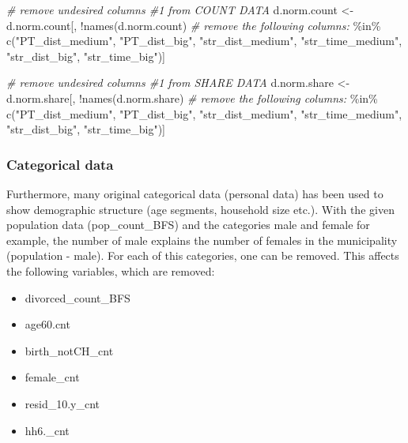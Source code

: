 \documentclass[
]{article}
\newenvironment{Shaded}{\begin{snugshade}}{\end{snugshade}}
\newcommand{\CommentTok}[1]{\textcolor[rgb]{0.56,0.35,0.01}{\textit{#1}}}
\newcommand{\FunctionTok}[1]{\textcolor[rgb]{0.00,0.00,0.00}{#1}}
\newcommand{\NormalTok}[1]{#1}
\newcommand{\OtherTok}[1]{\textcolor[rgb]{0.56,0.35,0.01}{#1}}
\newcommand{\SpecialCharTok}[1]{\textcolor[rgb]{0.00,0.00,0.00}{#1}}
\newcommand{\StringTok}[1]{\textcolor[rgb]{0.31,0.60,0.02}{#1}}
\providecommand{\tightlist}{%
  \setlength{\itemsep}{0pt}\setlength{\parskip}{0pt}}
\begin{document}
\begin{Shaded}
\begin{Highlighting}[]
\CommentTok{\# remove undesired columns \#1 from COUNT DATA}
\NormalTok{d.norm.count }\OtherTok{\textless{}{-}}\NormalTok{ d.norm.count[, }\SpecialCharTok{!}\FunctionTok{names}\NormalTok{(d.norm.count) }\CommentTok{\# remove the following columns:}
                             \SpecialCharTok{\%in\%} \FunctionTok{c}\NormalTok{(}\StringTok{"PT\_dist\_medium"}\NormalTok{, }\StringTok{"PT\_dist\_big"}\NormalTok{, }\StringTok{"str\_dist\_medium"}\NormalTok{, }
                                    \StringTok{"str\_time\_medium"}\NormalTok{, }\StringTok{"str\_dist\_big"}\NormalTok{, }\StringTok{"str\_time\_big"}\NormalTok{)]}

\CommentTok{\# remove undesired columns \#1 from SHARE DATA}
\NormalTok{d.norm.share }\OtherTok{\textless{}{-}}\NormalTok{ d.norm.share[, }\SpecialCharTok{!}\FunctionTok{names}\NormalTok{(d.norm.share) }\CommentTok{\# remove the following columns:}
                             \SpecialCharTok{\%in\%} \FunctionTok{c}\NormalTok{(}\StringTok{"PT\_dist\_medium"}\NormalTok{, }\StringTok{"PT\_dist\_big"}\NormalTok{, }\StringTok{"str\_dist\_medium"}\NormalTok{, }
                                    \StringTok{"str\_time\_medium"}\NormalTok{, }\StringTok{"str\_dist\_big"}\NormalTok{, }\StringTok{"str\_time\_big"}\NormalTok{)]}
\end{Highlighting}
\end{Shaded}

\hypertarget{categorical-data}{%
\subsubsection{Categorical data}\label{categorical-data}}

Furthermore, many original categorical data (personal data) has been
used to show demographic structure (age segments, household size etc.).
With the given population data (pop\_count\_BFS) and the categories male
and female for example, the number of male explains the number of
females in the municipality (population - male). For each of this
categories, one can be removed. This affects the following variables,
which are removed:

\begin{itemize}
\tightlist
\item
  divorced\_count\_BFS
\item
  age60.cnt
\item
  birth\_notCH\_cnt
\item
  female\_cnt
\item
  resid\_10.y\_cnt
\item
  hh6.\_cnt
\end{itemize}
\end{document}
